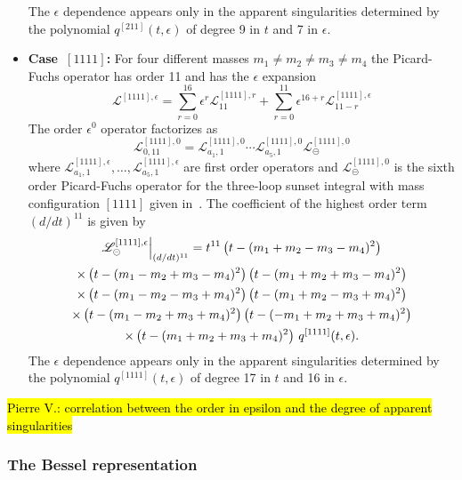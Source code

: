 \documentclass[a4paper,12pt]{article}
\numberwithin{equation}{section}
\numberwithin{figure}{section}
\def\su{\circleddash}
\newcommand{\pvnote}[1]{\sethlcolor{bubblegum} \protect\hl{Pierre V.: #1} \sethlcolor{yellow}}
\begin{document}
\begin{itemize}
                 The $\epsilon$ dependence appears only in the
                 apparent singularities determined by the polynomial
                 $q^{[211]}(t,\epsilon)$ of degree 9 in $t$  and 7 in $\epsilon$.
  \item   {\bf Case~$[1111]$:} For four different masses $m_1\neq m_2\neq m_3 \neq m_4$ the
  Picard-Fuchs operator has order 11 and has the $\epsilon$ expansion 
  \begin{equation}
    \mathscr{L}^{[1111],\epsilon}=     \sum_{r=0}^{16}\epsilon^r
    \mathscr{L}^{[1111],r}_{11}+\sum_{r=0}^{11} \epsilon^{16+r}  \mathscr{L}^{[1111],\epsilon}_{11-r}
  \end{equation}
    The order $\epsilon^0$ operator factorizes as
  \begin{equation}
         \mathscr{L}^{[1111],0}_{0,11}=   \mathscr{L}^{[1111],0}_{a_1,1}  \cdots  \mathscr{L}^{[1111],0}_{a_5,1}   \mathscr{L}^{[1111],0}_{\su}
       \end{equation}
        where  $ \mathscr{L}^{[1111],\epsilon}_{a_1,1},\dots,  \mathscr{L}^{[1111],\epsilon}_{a_5,1}$ are  first order operators
       and $\mathscr{L}^{[1111],0}_{\su}$ is the sixth  order  Picard-Fuchs operator for the
       three-loop sunset integral with mass configuration $[1111]$
       given in~\cite{Lairez:2022zkj}.
        The coefficient of the highest order term $(d/dt)^{11}$    is given by
       \begin{multline}
                   \mathscr{L}^{[1111],\epsilon}_\su\Big\vert_{(d/dt)^{11}}=
                   t^{11}\left(t-(m_{1}+m_{2}-m_{3}-m_{4})^2\right) \cr\times
   \left(t-(m_{1}-m_{2}+m_{3}-m_{4})^2\right)
   \left(t-(m_{1}+m_{2}+m_{3}-m_{4})^2\right) \cr\times
   \left(t-(m_{1}-m_{2}-m_{3}+m_{4})^2\right)
   \left(t-(m_{1}+m_{2}-m_{3}+m_{4})^2\right)\cr\times
   \left(t-(m_{1}-m_{2}+m_{3}+m_{4})^2\right)
   \left(t-(-m_{1}+m_{2}+m_{3}+m_{4})^2\right) \cr\times
   \left(t-(m_{1}+m_{2}+m_{3}+m_{4})^2\right)
                   \, q^{[1111]}(t,\epsilon).
                 \end{multline}
                 The $\epsilon$ dependence appears only in the
                 apparent singularities determined by the polynomial
                 $q^{[1111]}(t,\epsilon)$ of degree 17 in
                 $t$ and 16 in $\epsilon$.
     \end{itemize}
\pvnote{correlation between the order in epsilon and the degree of
  apparent singularities}
\subsubsection{The Bessel representation}
\end{document}

